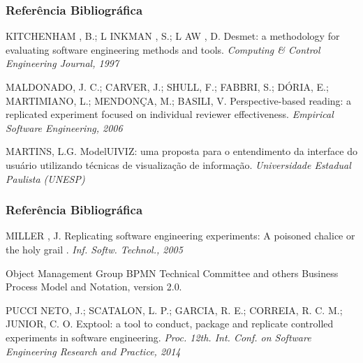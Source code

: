 \documentclass[aspectratio=169]{beamer}
\begin{document}
\begin{frame}
\frametitle{Referência Bibliográfica}
\footnotesize{
\begin{thebibliography}{99} %

 KITCHENHAM , B.; L INKMAN , S.; L AW , D.
\newblock Desmet: a methodology for evaluating software engineering methods and tools.
\newblock \emph{Computing \& Control Engineering Journal, 1997}

 MALDONADO, J. C.; CARVER, J.; SHULL, F.; FABBRI, S.; DÓRIA, E.; MARTIMIANO, L.; MENDONÇA, M.; BASILI, V.
\newblock Perspective-based reading: a replicated experiment focused on individual reviewer effectiveness.
\newblock \emph{Empirical Software Engineering, 2006}

 MARTINS, L.G.
\newblock ModelUIVIZ: uma proposta para o entendimento da interface do usuário utilizando técnicas de visualização de informação.
\newblock \emph{Universidade Estadual Paulista (UNESP)}

\end{thebibliography}
}
\end{frame}

\begin{frame}
\frametitle{Referência Bibliográfica}
\footnotesize{
\begin{thebibliography}{99} %

 MILLER , J.
\newblock Replicating software engineering experiments: A poisoned chalice or the holy grail .
\newblock \emph{Inf. Softw. Technol., 2005}


 Object Management Group BPMN Technical Committee and others
\newblock Business Process Model and Notation, version 2.0.

 PUCCI NETO, J.; SCATALON, L. P.; GARCIA, R. E.; CORREIA, R. C. M.; JUNIOR, C. O.
\newblock Exptool: a tool to conduct, package and replicate controlled experiments in software
engineering.
\newblock \emph{Proc. 12th. Int. Conf. on Software Engineering Research and Practice, 2014}

\end{thebibliography}
}
\end{frame}
\end{document}
